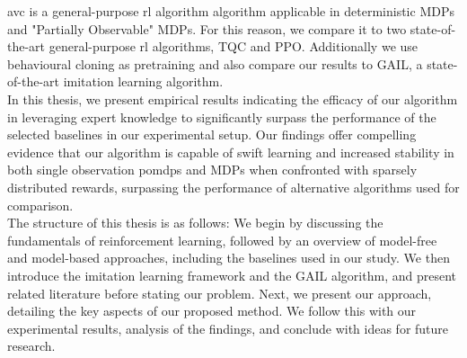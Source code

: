 \ac{avc} is a general-purpose \ac{rl} algorithm algorithm applicable in deterministic MDPs and "Partially Observable" MDPs. 
For this reason, we compare it to two state-of-the-art general-purpose \ac{rl} algorithms, TQC and PPO. Additionally we use behavioural cloning as pretraining  
and also compare our results to GAIL, a state-of-the-art imitation learning algorithm.\\
In this thesis, we present empirical results indicating the efficacy of our algorithm in leveraging expert knowledge to significantly surpass the performance of the selected baselines in our 
experimental setup. Our findings offer compelling evidence that our algorithm is capable of swift learning and increased stability in both single observation \ac{pomdp}s and MDPs when confronted with 
sparsely distributed rewards, surpassing the performance of alternative algorithms used for comparison.\\

The structure of this thesis is as follows: We begin by discussing the fundamentals of reinforcement learning, followed by an overview of model-free and model-based approaches, 
including the baselines used in our study. We then introduce the imitation learning framework and the GAIL algorithm, and present related literature before stating our problem. 
Next, we present our approach, detailing the key aspects of our proposed method. We follow this with our experimental results, analysis of the findings, and conclude with ideas for future research.